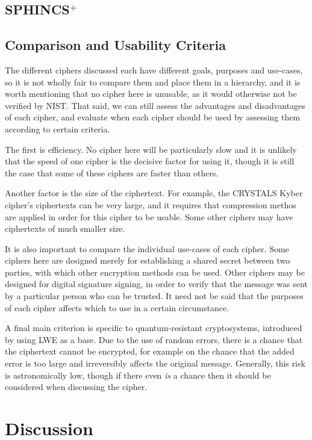 \documentclass{article}
\begin{document}
\subsection{SPHINCS$^+$}
\subsection{Comparison and Usability Criteria}
   The different ciphers discussed each have different goals, purposes and use-cases, so it is not wholly
   fair to compare them and place them in a hierarchy, and it is worth mentioning that no cipher here is
   unusable, as it would otherwise not be verified by NIST. That said, we can still assess the advantages
   and disadvantages of each cipher, and evaluate when each cipher should be used by assessing them according
   to certain criteria.
   \par
   The first is efficiency. No cipher here will be particularly slow and it is unlikely that the speed of one cipher
   is the decisive factor for using it, though it is still the case that some of these ciphers are faster than others.
   \par
   Another factor is the size of the ciphertext. For example, the CRYSTALS Kyber cipher's ciphertexts can be very
   large, and it requires that compression methos are applied in order for this cipher to be usable. Some other ciphers
   may have ciphertexts of much smaller size.
   \par
   It is also important to compare the individual use-cases of each cipher. Some ciphers here are designed merely for
   establishing a shared secret between two parties, with which other encryption methods can be used. Other ciphers may
   be designed for digital signature signing, in order to verify that the message was sent by a particular person who can
   be trusted. It need not be said that the purposes of each cipher affects which to use in a certain circumstance.
   \par
   A final main criterion is specific to quantum-resistant cryptosystems, introduced by using LWE as a base. Due to the
   use of random errors, there is a chance that the ciphertext cannot be encrypted, for example on the chance that
   the added error is too large and irreversibly affects the original message. Generally, this risk is astronomically low,
   though if there even \textit{is} a chance then it should be considered when discussing the cipher.


\section{Discussion}
\end{document}
